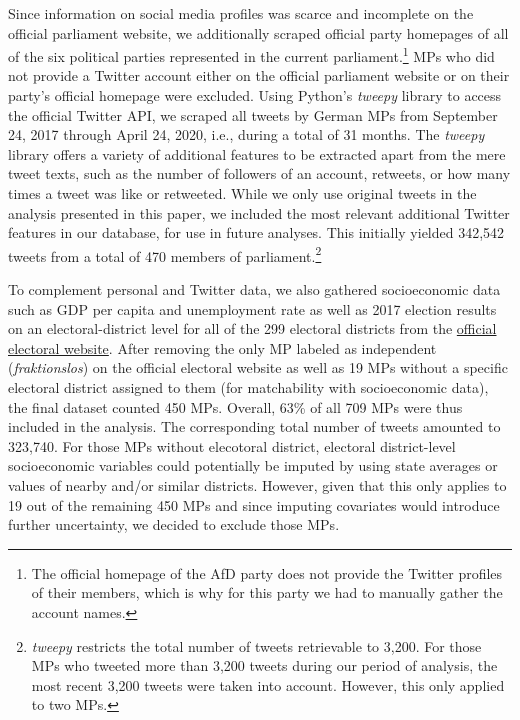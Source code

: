 \documentclass[12pt]{article}
\begin{document}
Since information on social media profiles was scarce and incomplete on the official parliament website, we additionally scraped official party homepages of all of the six political parties represented in the current parliament.\footnote{The official homepage of the AfD party does not provide the Twitter profiles of their members, which is why for this party we had to manually gather the account names.} MPs who did not provide a Twitter account either on the official parliament website or on their party's official homepage were excluded. Using Python's \textit{tweepy} library to access the official Twitter API, we scraped all tweets by German MPs from September 24, 2017 through April 24, 2020, i.e., during a total of 31 months. The \textit{tweepy} library offers a variety of additional features to be extracted apart from the mere tweet texts, such as the number of followers of an account, retweets, or how many times a tweet was like or retweeted. While we only use original tweets in the analysis presented in this paper, we included the most relevant additional Twitter features in our database, for use in future analyses. This initially yielded 342,542 tweets from a total of 470 members of parliament.\footnote{\textit{tweepy} restricts the total number of tweets retrievable to 3,200. For those MPs who tweeted more than 3,200 tweets during our period of analysis, the most recent 3,200 tweets were taken into account. However, this only applied to two MPs.}

To complement personal and Twitter data, we also gathered socioeconomic data such as GDP per capita and unemployment rate as well as 2017 election results on an electoral-district level for all of the 299 electoral districts from the \href{https://www.bundeswahlleiter.de}{official electoral website}. After removing the only MP labeled as independent (\textit{fraktionslos}) on the official electoral website as well as 19 MPs without a specific electoral district assigned to them (for matchability with socioeconomic data), the final dataset counted 450 MPs. Overall, 63\% of all 709 MPs were thus included in the analysis. The corresponding total number of tweets amounted to 323,740. For those MPs without elecotoral district, electoral district-level socioeconomic variables could potentially be imputed by using state averages or values of nearby and/or similar districts. However, given that this only applies to 19 out of the remaining 450 MPs and since imputing covariates would introduce further uncertainty, we decided to exclude those MPs.
\end{document}
